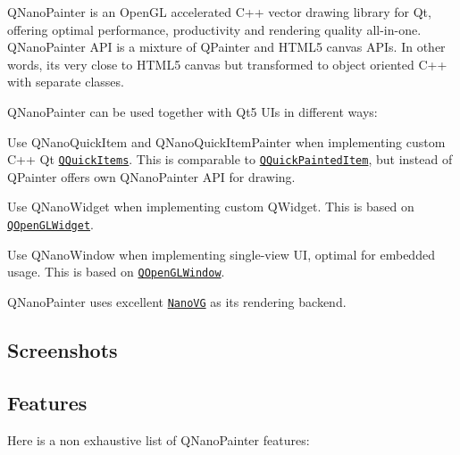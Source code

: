Q\+Nano\+Painter is an Open\+GL accelerated C++ vector drawing library for Qt, offering optimal performance, productivity and rendering quality all-\/in-\/one. Q\+Nano\+Painter A\+PI is a mixture of Q\+Painter and H\+T\+M\+L5 canvas A\+P\+Is. In other words, it\textquotesingle{}s very close to H\+T\+M\+L5 canvas but transformed to object oriented C++ with separate classes.

Q\+Nano\+Painter can be used together with Qt5 U\+Is in different ways\+:


\begin{DoxyItemize}
\item Use Q\+Nano\+Quick\+Item and Q\+Nano\+Quick\+Item\+Painter when implementing custom C++ Qt \href{http://doc.qt.io/qt-5/qquickitem.html}{\tt Q\+Quick\+Items}. This is comparable to \href{http://doc.qt.io/qt-5/qquickpainteditem.html}{\tt Q\+Quick\+Painted\+Item}, but instead of Q\+Painter offers own Q\+Nano\+Painter A\+PI for drawing.
\item Use Q\+Nano\+Widget when implementing custom Q\+Widget. This is based on \href{http://doc.qt.io/qt-5/qopenglwidget.html}{\tt Q\+Open\+G\+L\+Widget}.
\item Use Q\+Nano\+Window when implementing single-\/view UI, optimal for embedded usage. This is based on \href{http://doc.qt.io/qt-5/qopenglwindow.html}{\tt Q\+Open\+G\+L\+Window}.
\end{DoxyItemize}

Q\+Nano\+Painter uses excellent \href{https://github.com/memononen/nanovg}{\tt Nano\+VG} as its rendering backend.

\subsection*{Screenshots}

 

\subsection*{Features}

Here is a non exhaustive list of Q\+Nano\+Painter features\+:


